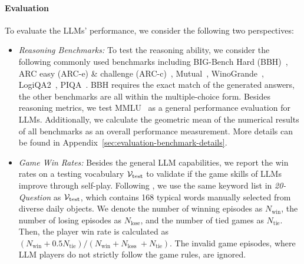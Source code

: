 \documentclass{article}
\theoremstyle{plain}
\theoremstyle{definition}
\theoremstyle{remark}
\begin{document}
\paragraph{Evaluation}
To evaluate the LLMs' performance, we consider the following two perspectives:
\begin{itemize}[leftmargin=14pt]
\vspace{-1mm}
    \item \textit{Reasoning Benchmarks: } To test the reasoning ability, we consider the following commonly used benchmarks including BIG-Bench Hard (BBH)~\citep{suzgun2022challenging}, ARC easy (ARC-e) \& challenge (ARC-c)~\citep{Clark2018ThinkYH}, Mutual~\citep{mutual}, WinoGrande~\citep{sakaguchi2019winogrande}, LogiQA2~\citep{10174688}, PIQA~\citep{Bisk2020}. BBH requires the exact match of the generated answers, the other benchmarks are all within the multiple-choice form. %
Besides reasoning metrics, we test MMLU~\citep{DBLP:journals/corr/abs-2009-03300} as a general performance evaluation for LLMs. Additionally, we calculate the geometric mean of the numerical results of all benchmarks as an overall performance measurement.  More details can be found in Appendix~\ref{sec:evaluation-benchmark-details}. 
    \item  \textit{Game Win Rates: } Besides the general LLM capabilities, we report the win rates on a testing vocabulary ${\mathcal{V}}_\text{test}$  to validate if the game skills of LLMs improve through 
    self-play. Following \citet{abdulhai2023lmrl}, we use the same keyword list in \textit{20-Question}  as ${\mathcal{V}}_\text{test}$, which contains 168 typical words manually selected from diverse daily objects.  We denote the number of winning episodes as $N_\text{win}$, the number of losing episodes as $N_\text{lose}$, and the number of tied games as $N_\text{tie}$. Then, the player win rate is calculated as $(N_\text{win} + 0.5 N_\text{tie})/( N_\text{win} + N_\text{loss }+ N_\text{tie})$. The invalid game episodes, where LLM players do not strictly follow the game rules, are ignored.
\end{itemize}
\end{document}
